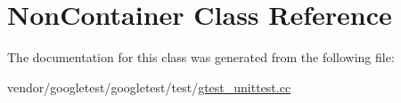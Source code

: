 \hypertarget{classNonContainer}{}\section{Non\+Container Class Reference}
\label{classNonContainer}


The documentation for this class was generated from the following file\+:\begin{DoxyCompactItemize}
\item 
vendor/googletest/googletest/test/\hyperlink{gtest__unittest_8cc}{gtest\+\_\+unittest.\+cc}\end{DoxyCompactItemize}
